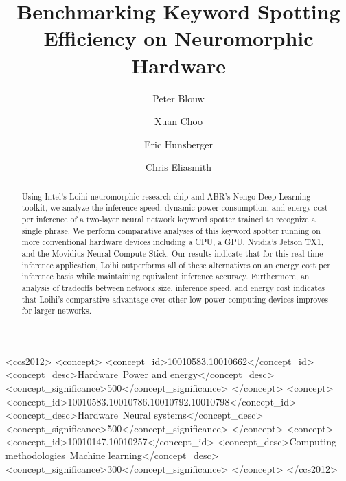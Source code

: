 \documentclass[sigconf, screen]{acmart}
\begin{document}
%
\title{Benchmarking Keyword Spotting Efficiency on Neuromorphic Hardware}

%
\author{Peter Blouw}
\author{Xuan Choo}
\author{Eric Hunsberger}
\author{Chris Eliasmith}

%
\renewcommand{\shortauthors}{Blouw et al.}

\begin{abstract}
Using Intel's Loihi neuromorphic research chip and ABR's Nengo Deep Learning toolkit, we analyze the inference speed, dynamic power consumption, and energy cost per inference of a two-layer neural network keyword spotter trained to recognize a single phrase. We perform comparative analyses of this keyword spotter running on more conventional hardware devices including a CPU, a GPU, Nvidia's Jetson TX1, and the Movidius Neural Compute Stick. Our results indicate that for this real-time inference application, Loihi outperforms all of these alternatives on an energy cost per inference basis while maintaining equivalent inference accuracy. Furthermore, an analysis of tradeoffs between network size, inference speed, and energy cost indicates that Loihi's comparative advantage over other low-power computing devices improves for larger networks.  
\end{abstract}

%
\begin{CCSXML}
<ccs2012>
<concept>
<concept_id>10010583.10010662</concept_id>
<concept_desc>Hardware~Power and energy</concept_desc>
<concept_significance>500</concept_significance>
</concept>
<concept>
<concept_id>10010583.10010786.10010792.10010798</concept_id>
<concept_desc>Hardware~Neural systems</concept_desc>
<concept_significance>500</concept_significance>
</concept>
<concept>
<concept_id>10010147.10010257</concept_id>
<concept_desc>Computing methodologies~Machine learning</concept_desc>
<concept_significance>300</concept_significance>
</concept>
</ccs2012>
\end{CCSXML}
\end{document}

